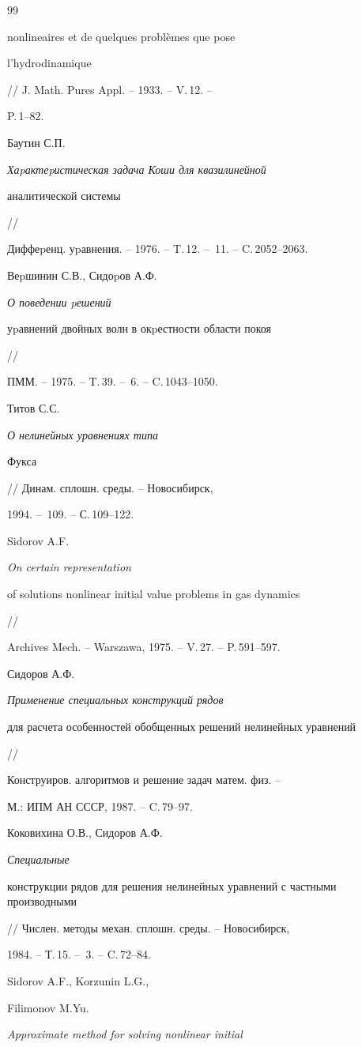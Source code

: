 \begin{thebibliography}{99}
{nonlineaires et de quelques probl\`{e}mes que pose


l'hydrodinamique} // J. Math. Pures Appl. -- 1933. -- V.\,12. --


P.\,1--82.




Баутин С.П. {\em Хаpактеpистическая задача Коши для квазилинейной


аналитической системы} //


Диффеpенц. уpавнения. -- 1976. -- T.\,12. -- \No\,11. -- C.\,2052--2063.




Веpшинин С.В., Сидоpов А.Ф. {\em О поведении pешений


уpавнений двойных волн в окpестности области покоя} //


ПММ. -- 1975. -- T.\,39. -- \No\,6. -- C.\,1043--1050.


 Титов С.С. {\em О нелинейных уравнениях типа


Фукса} // Динам. сплошн. среды. -- Новосибирск,


1994. -- \No\,109. -- С.\,109--122.


 Sidorov A.F. {\em On certain representation


of solutions nonlinear initial value problems in gas dynamics} //


Archives Mech. -- Warszawa, 1975. -- V.\,27. -- P.\,591--597.


 Сидоров А.Ф.


{\em Применение специальных конструкций рядов


для расчета особенностей обобщенных решений нелинейных уравнений} //


Конструиров. алгоритмов и решение задач матем. физ. --


М.: ИПМ АН СССР, 1987. -- C.\,79--97.


 Коковихина О.В., Сидоров А.Ф. {\em Специальные


конструкции рядов для решения нелинейных уравнений с частными производными}


// Числен. методы механ. сплошн. среды. -- Новосибирск,


1984. -- Т.\,15. -- \No\,3. -- C.\,72--84.


 Sidorov A.F., Korzunin L.G.,


Filimonov M.Yu. {\em Approximate method for solving nonlinear initial


}
\end{thebibliography}
